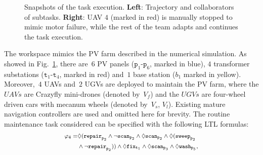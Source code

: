 \begin{figure}[t!]
\begin{minipage}[t]{0.49\linewidth}
\end{minipage}%
\caption{Snapshots of the task execution. \textbf{Left}:
Trajectory and collaborators of subtasks.
\textbf{Right}: UAV $4$ (marked in red) is manually stopped to mimic motor failure,
while the rest of the team adapts and continues
the task execution.}
\label{fig:ws}
\end{figure}

The workspace mimics the PV farm described in the numerical simulation.
As showed in Fig.~\ref{fig:ws},
there are~$6$ PV panels ($\texttt{p}_1$-$\texttt{p}_6$, marked in blue),
$4$ transformer substations
($\texttt{t}_1$-$\texttt{t}_4$, marked in red)
and~$1$ base station ($b_1$ marked in yellow).
Moreover,~$4$ UAVs and~$2$ UGVs are deployed to maintain the PV farm,
where the $UAVs$ are Crazyfly mini-drones (denoted by~$V_f$) and
the $UGVs$ are four-wheel driven cars with mecanum wheels (denoted by~$V_s$, $V_l$).
Existing mature navigation controllers are used and omitted here for brevity.
The routine maintenance task considered can be specified with the following LTL formulas:
\begin{equation}\footnotesize
\begin{aligned}
	\varphi_4=& \Diamond(\texttt{repair}_{\texttt{p}_2} \land  \lnot\texttt{scan}_{\texttt{p}_2} \land \Diamond
	\texttt{scan}_{\texttt{p}_2} 
	\land \Diamond (\texttt{sweep}_{\texttt{p}_2} \\ 
	& \land \lnot \texttt{repair}_{\texttt{p}_2}) )\land \Diamond \texttt{fix}_{\texttt{t}_1} \land \Diamond \texttt{scan}_{\texttt{p}_3}
	\land \Diamond \texttt{wash}_{\texttt{p}_5},
\end{aligned}
\end{equation}

